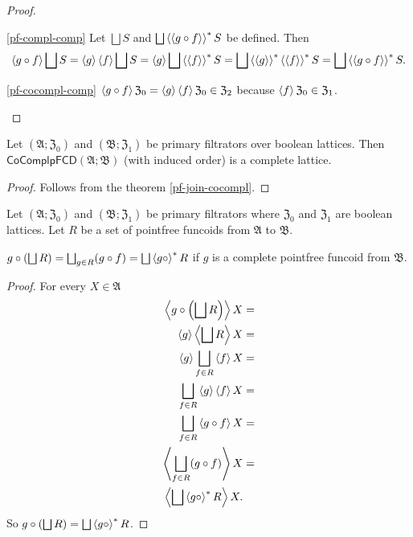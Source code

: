 \begin{proof}
~
\begin{widedisorder}
\item [{\ref{pf-compl-comp}}] Let $\bigsqcup S$ and $\bigsqcup\left\langle \left\langle g\circ f\right\rangle\right\rangle ^{\ast}S$
be defined. Then
\[
\left\langle g\circ f\right\rangle\bigsqcup S=\left\langle g\right\rangle\left\langle f\right\rangle\bigsqcup S=\left\langle g\right\rangle\bigsqcup\left\langle \left\langle f\right\rangle\right\rangle ^{\ast}S=\bigsqcup\left\langle \left\langle g\right\rangle\right\rangle ^{\ast}\left\langle \left\langle f\right\rangle\right\rangle ^{\ast}S=\bigsqcup\left\langle \left\langle g\circ f\right\rangle\right\rangle ^{\ast}S.
\]

\item [{\ref{pf-cocompl-comp}}] $\left\langle g\circ f\right\rangle\mathfrak{Z}_{0}=\left\langle g\right\rangle\left\langle f\right\rangle\mathfrak{Z}_{0}\in\mathfrak{Z}_{2}$
because $\left\langle f\right\rangle\mathfrak{Z}_{0}\in\mathfrak{Z}_{1}$.
\end{widedisorder}
\end{proof}
\begin{prop}
Let $(\mathfrak{A};\mathfrak{Z}_{0})$ and $(\mathfrak{B};\mathfrak{Z}_{1})$
be primary filtrators over boolean lattices. Then $\mathsf{CoComplpFCD}(\mathfrak{A};\mathfrak{B})$
(with induced order) is a complete lattice.\end{prop}
\begin{proof}
Follows from the theorem \ref{pf-join-cocompl}.\end{proof}
\begin{thm}
Let $(\mathfrak{A};\mathfrak{Z}_{0})$ and $(\mathfrak{B};\mathfrak{Z}_{1})$
be primary filtrators where $\mathfrak{Z}_{0}$ and $\mathfrak{Z}_{1}$
are boolean lattices. Let $R$ be a set of pointfree funcoids from
$\mathfrak{A}$ to $\mathfrak{B}$.

$g\circ\left(\bigsqcup R\right)=\bigsqcup_{g\in R}(g\circ f)=\bigsqcup\left\langle g\circ\right\rangle ^{\ast}R$
if $g$ is a complete pointfree funcoid from $\mathfrak{B}$.\end{thm}
\begin{proof}
For every $X\in\mathfrak{A}$
\begin{align*}
\left\langle g\circ\left(\bigsqcup R\right)\right\rangle X & =\\
\left\langle g\right\rangle\left\langle \bigsqcup R\right\rangle X & =\\
\left\langle g\right\rangle\bigsqcup_{f\in R}\left\langle f\right\rangle X & =\\
\bigsqcup_{f\in R}\left\langle g\right\rangle\left\langle f\right\rangle X & =\\
\bigsqcup_{f\in R}\left\langle g\circ f\right\rangle X & =\\
\left\langle \bigsqcup_{f\in R}(g\circ f)\right\rangle X & =\\
\left\langle \bigsqcup\left\langle g\circ\right\rangle ^{\ast}R\right\rangle X.
\end{align*}
So $g\circ\left(\bigsqcup R\right)=\bigsqcup\left\langle g\circ\right\rangle ^{\ast}R$.
\end{proof}

